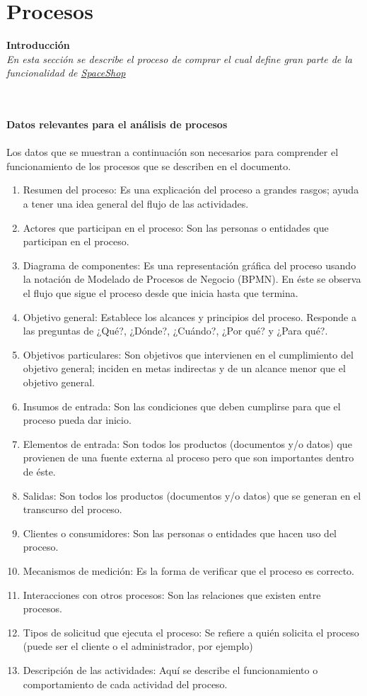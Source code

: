 \chapter{Procesos}
\textbf{\Large Introducci\'on \\}
\textit{En esta secci\'on se describe el proceso de comprar el cual define gran parte de la funcionalidad de \hyperlink{SpaceShop}{SpaceShop}\\ \\}

\textit{\\}
\textbf{\Large Datos relevantes para el an\'alisis de procesos\\\\}
Los datos que se muestran a continuaci\'on son necesarios para comprender el funcionamiento de los procesos que se describen en el documento.
\textit{\\}

\begin{enumerate}
	\item Resumen del proceso: Es una explicación del proceso a grandes rasgos; ayuda a tener una idea general del flujo de las actividades.
	\item Actores que participan en el proceso: Son las personas o entidades que participan en el proceso.
	\item Diagrama de componentes: Es una representación gráfica del proceso usando la notación de Modelado de Procesos de Negocio (BPMN). En éste se observa el flujo que sigue el
 proceso desde que inicia hasta que termina.
	\item Objetivo general: Establece los alcances y principios del proceso. Responde a las preguntas de ¿Qué?, ¿Dónde?, ¿Cuándo?, ¿Por qué? y ¿Para qué?.
	\item Objetivos particulares: Son objetivos que intervienen en el cumplimiento del objetivo general; inciden en metas indirectas y de un alcance menor que el objetivo general.
	\item Insumos de entrada: Son las condiciones que deben cumplirse para que el proceso pueda dar inicio.
	\item Elementos de entrada: Son todos los productos (documentos y/o datos) que provienen de una fuente externa al proceso pero que son importantes dentro de éste.
	\item Salidas: Son todos los productos (documentos y/o datos) que se generan en el transcurso del proceso.
	\item Clientes o consumidores: Son las personas o entidades que hacen uso del proceso.
	\item Mecanismos de medición: Es la forma de verificar que el proceso es correcto.
	\item Interacciones con otros procesos: Son las relaciones que existen entre procesos.
	\item Tipos de solicitud que ejecuta el proceso: Se refiere a quién solicita el proceso (puede ser el cliente o el administrador, por ejemplo)
	\item Descripci\'on de las actividades: Aquí se describe el funcionamiento o comportamiento de cada actividad del proceso.
\end{enumerate}